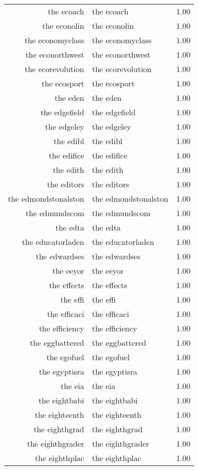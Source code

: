 \begin{table}[ht]
\begin{tabular}{rlr}
  the ecoach & the ecoach & 1.00 \\ 
  the econolin & the econolin & 1.00 \\ 
  the economyclass & the economyclass & 1.00 \\ 
  the econorthwest & the econorthwest & 1.00 \\ 
  the ecorevolution & the ecorevolution & 1.00 \\ 
  the ecosport & the ecosport & 1.00 \\ 
  the eden & the eden & 1.00 \\ 
  the edgefield & the edgefield & 1.00 \\ 
  the edgeley & the edgeley & 1.00 \\ 
  the edibl & the edibl & 1.00 \\ 
  the edifice & the edifice & 1.00 \\ 
  the edith & the edith & 1.00 \\ 
  the editors & the editors & 1.00 \\ 
  the edmondstonalston & the edmondstonalston & 1.00 \\ 
  the edmundscom & the edmundscom & 1.00 \\ 
  the edta & the edta & 1.00 \\ 
  the educatorladen & the educatorladen & 1.00 \\ 
  the edwardses & the edwardses & 1.00 \\ 
  the eeyor & the eeyor & 1.00 \\ 
  the effects & the effects & 1.00 \\ 
  the effi & the effi & 1.00 \\ 
  the efficaci & the efficaci & 1.00 \\ 
  the efficiency & the efficiency & 1.00 \\ 
  the eggbattered & the eggbattered & 1.00 \\ 
  the egofuel & the egofuel & 1.00 \\ 
  the egyptisra & the egyptisra & 1.00 \\ 
  the eia & the eia & 1.00 \\ 
  the eightbabi & the eightbabi & 1.00 \\ 
  the eighteenth & the eighteenth & 1.00 \\ 
  the eighthgrad & the eighthgrad & 1.00 \\ 
  the eighthgrader & the eighthgrader & 1.00 \\ 
  the eighthplac & the eighthplac & 1.00 \\ 

\end{tabular}
\end{table}
